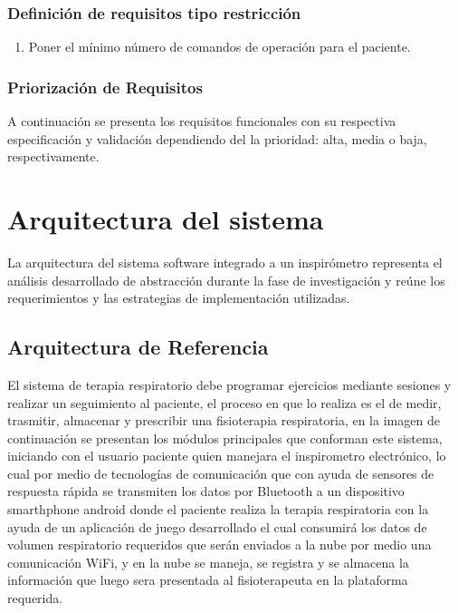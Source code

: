 \documentclass[12pt]{article}
\begin{document}
\subsubsection{Definición de requisitos tipo restricción}

\begin{enumerate}[start=1,label={\bfseries RTR\arabic*.}]

\item Poner el mínimo número de comandos de operación para el paciente.


\end{enumerate}


\subsubsection{Priorización de Requisitos}

A continuación se presenta los requisitos funcionales con su respectiva especificación y validación dependiendo del la prioridad: alta, media o baja, respectivamente.







\section{Arquitectura del sistema}

La arquitectura del sistema software integrado a un inspirómetro representa el análisis desarrollado de abstracción durante la fase de investigación y reúne los requerimientos y las estrategias de implementación utilizadas.



\subsection{Arquitectura de Referencia}


El sistema de terapia respiratorio debe programar ejercicios mediante sesiones y realizar un seguimiento al paciente, el proceso en que lo realiza es el de medir, trasmitir, almacenar y prescribir una fisioterapia respiratoria, en la imagen de continuación se presentan los módulos principales que conforman este sistema, iniciando con el usuario paciente quien manejara el inspirometro electrónico, lo cual por medio de tecnologías de comunicación que con ayuda de sensores de respuesta rápida se transmiten los datos por Bluetooth a un dispositivo smarthphone android donde el paciente realiza la terapia respiratoria con la ayuda de un aplicación de juego desarrollado el cual consumirá los datos de volumen respiratorio requeridos que serán enviados a la nube por medio una comunicación WiFi, y en la nube se maneja, se registra y se almacena la información que luego sera presentada al fisioterapeuta en la plataforma requerida.
\end{document}
